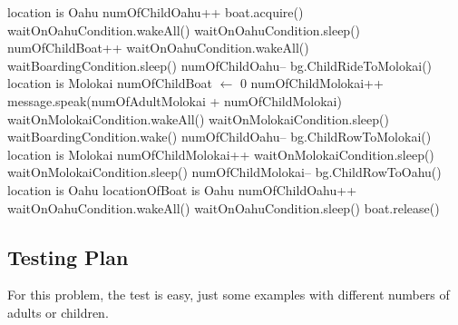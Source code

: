 \documentclass{article}
\begin{document}
\begin{algorithm}
    \begin{algorithmic}
        \State location is Oahu
        \State numOfChildOahu++
            \State boat.acquire()
                        \State waitOnOahuCondition.wakeAll()
                    \EndIf
                    \State waitOnOahuCondition.sleep()
                \EndWhile
                \State numOfChildBoat++
                    \State waitOnOahuCondition.wakeAll()
                    \State waitBoardingCondition.sleep()
                    \State numOfChildOahu--
                    \State bg.ChildRideToMolokai()
                    \State location is Molokai
                    \State numOfChildBoat $\leftarrow$ 0
                    \State numOfChildMolokai++
                    \State message.speak(numOfAdultMolokai + numOfChildMolokai)
                    \State waitOnMolokaiCondition.wakeAll()
                    \State waitOnMolokaiCondition.sleep()
                \Else
                    \State waitBoardingCondition.wake()
                    \State numOfChildOahu--
                    \State bg.ChildRowToMolokai()
                    \State location is Molokai
                    \State numOfChildMolokai++
                    \State waitOnMolokaiCondition.sleep()
                \EndIf
            \Else
                    \State waitOnMolokaiCondition.sleep()
                \EndWhile
                \State numOfChildMolokai--
                \State bg.ChildRowToOahu()
                \State location is Oahu
                \State locationOfBoat is Oahu
                \State numOfChildOahu++
                \State waitOnOahuCondition.wakeAll()
                \State waitOnOahuCondition.sleep()
            \EndIf
            \State boat.release()
        \EndWhile
    \EndProcedure
    \end{algorithmic}
\end{algorithm}

\subsection{Testing Plan}

For this problem, the test is easy, just some examples with different numbers of adults or children.
\end{document}
